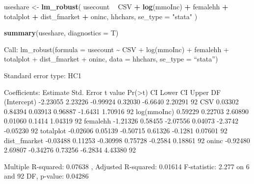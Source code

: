\documentclass[
]{article}
\newenvironment{Shaded}{\begin{snugshade}}{\end{snugshade}}
\newcommand{\CommentTok}[1]{\textcolor[rgb]{0.56,0.35,0.01}{\textit{#1}}}
\newcommand{\DataTypeTok}[1]{\textcolor[rgb]{0.13,0.29,0.53}{#1}}
\newcommand{\FloatTok}[1]{\textcolor[rgb]{0.00,0.00,0.81}{#1}}
\newcommand{\KeywordTok}[1]{\textcolor[rgb]{0.13,0.29,0.53}{\textbf{#1}}}
\newcommand{\NormalTok}[1]{#1}
\newcommand{\OperatorTok}[1]{\textcolor[rgb]{0.81,0.36,0.00}{\textbf{#1}}}
\newcommand{\OtherTok}[1]{\textcolor[rgb]{0.56,0.35,0.01}{#1}}
\newcommand{\StringTok}[1]{\textcolor[rgb]{0.31,0.60,0.02}{#1}}
\begin{document}
\begin{Shaded}
\begin{Highlighting}[]
\NormalTok{useshare <-}\StringTok{ }\KeywordTok{lm_robust}\NormalTok{(}
\NormalTok{    usecount }\OperatorTok{~}\StringTok{ }\NormalTok{CSV }\OperatorTok{+}\StringTok{ }\KeywordTok{log}\NormalTok{(mmoInc) }\OperatorTok{+}\StringTok{ }\NormalTok{femalehh }\OperatorTok{+}\StringTok{ }\NormalTok{totalplot }\OperatorTok{+}\StringTok{ }\NormalTok{dist_fmarket }\OperatorTok{+}\StringTok{ }\NormalTok{oninc,}
\NormalTok{    hhchars,}
    \DataTypeTok{se_type =} \StringTok{"stata"}
\NormalTok{  )}

\KeywordTok{summary}\NormalTok{(useshare, }\DataTypeTok{diagnostics =}\NormalTok{ T)}
\end{Highlighting}
\end{Shaded}

Call: lm\_robust(formula = usecount \textasciitilde{} CSV + log(mmoInc)
+ femalehh + totalplot + dist\_fmarket + oninc, data = hhchars, se\_type
= ``stata'')

Standard error type: HC1

Coefficients: Estimate Std. Error t value
Pr(\textgreater\textbar t\textbar) CI Lower CI Upper DF (Intercept)
-2.23055 2.23226 -0.99924 0.32030 -6.6640 2.20291 92 CSV 0.03302 0.84394
0.03913 0.96887 -1.6431 1.70916 92 log(mmoInc) 0.59229 0.22703 2.60890
0.01060 0.1414 1.04319 92 femalehh -1.21326 0.58455 -2.07556 0.04073
-2.3742 -0.05230 92 totalplot -0.02606 0.05139 -0.50715 0.61326 -0.1281
0.07601 92 dist\_fmarket -0.03488 0.11253 -0.30998 0.75728 -0.2584
0.18861 92 oninc -0.92480 2.69807 -0.34276 0.73256 -6.2834 4.43380 92

Multiple R-squared: 0.07638 , Adjusted R-squared: 0.01614 F-statistic:
2.277 on 6 and 92 DF, p-value: 0.04286

\begin{Shaded}
\end{Shaded}
\end{document}
